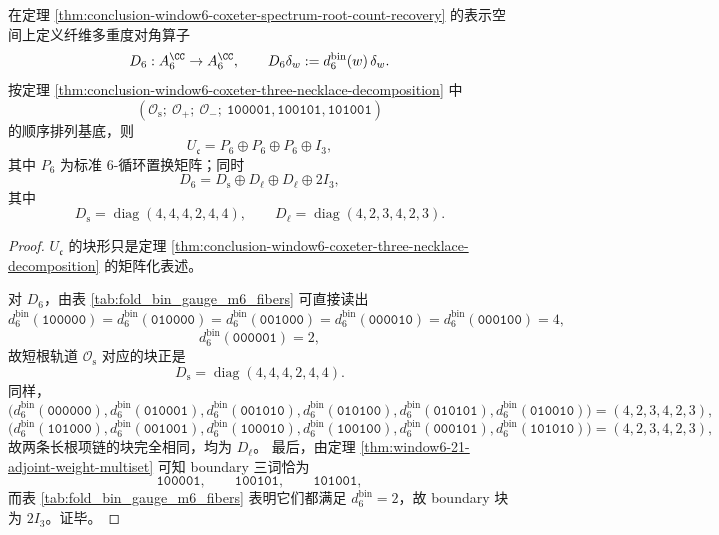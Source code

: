 \begin{theorem}\label{thm:conclusion-window6-coxeter-fold-block-normal-form}
在定理 \ref{thm:conclusion-window6-coxeter-spectrum-root-count-recovery} 的表示空间上定义纤维多重度对角算子
\[
D_6:A_6^{\CC}\to A_6^{\CC},\qquad
D_6\delta_w:=d_6^{\mathrm{bin}}(w)\,\delta_w.
\]
按定理 \ref{thm:conclusion-window6-coxeter-three-necklace-decomposition} 中
\[
(\mathcal O_{\mathrm{s}};\ \mathcal O_{+};\ \mathcal O_{-};\ \texttt{100001},\texttt{100101},\texttt{101001})
\]
的顺序排列基底，则
\[
U_{\mathfrak c}=P_6\oplus P_6\oplus P_6\oplus I_3,
\]
其中 \(P_6\) 为标准 \(6\)-循环置换矩阵；同时
\[
D_6=D_{\mathrm{s}}\oplus D_{\ell}\oplus D_{\ell}\oplus 2I_3,
\]
其中
\[
D_{\mathrm{s}}=\operatorname{diag}(4,4,4,2,4,4),\qquad
D_{\ell}=\operatorname{diag}(4,2,3,4,2,3).
\]
\end{theorem}
\begin{proof}
\(U_{\mathfrak c}\) 的块形只是定理 \ref{thm:conclusion-window6-coxeter-three-necklace-decomposition} 的矩阵化表述。

对 \(D_6\)，由表 \ref{tab:fold_bin_gauge_m6_fibers} 可直接读出
\[
d_6^{\mathrm{bin}}(\texttt{100000})=
d_6^{\mathrm{bin}}(\texttt{010000})=
d_6^{\mathrm{bin}}(\texttt{001000})=
d_6^{\mathrm{bin}}(\texttt{000010})=
d_6^{\mathrm{bin}}(\texttt{000100})=4,
\]
\[
d_6^{\mathrm{bin}}(\texttt{000001})=2,
\]
故短根轨道 \(\mathcal O_{\mathrm{s}}\) 对应的块正是
\[
D_{\mathrm{s}}=\operatorname{diag}(4,4,4,2,4,4).
\]
同样，
\[
\bigl(
d_6^{\mathrm{bin}}(\texttt{000000}),
d_6^{\mathrm{bin}}(\texttt{010001}),
d_6^{\mathrm{bin}}(\texttt{001010}),
d_6^{\mathrm{bin}}(\texttt{010100}),
d_6^{\mathrm{bin}}(\texttt{010101}),
d_6^{\mathrm{bin}}(\texttt{010010})
\bigr)
=(4,2,3,4,2,3),
\]
\[
\bigl(
d_6^{\mathrm{bin}}(\texttt{101000}),
d_6^{\mathrm{bin}}(\texttt{001001}),
d_6^{\mathrm{bin}}(\texttt{100010}),
d_6^{\mathrm{bin}}(\texttt{100100}),
d_6^{\mathrm{bin}}(\texttt{000101}),
d_6^{\mathrm{bin}}(\texttt{101010})
\bigr)
=(4,2,3,4,2,3),
\]
故两条长根项链的块完全相同，均为 \(D_{\ell}\)。
最后，由定理 \ref{thm:window6-21-adjoint-weight-multiset} 可知 boundary 三词恰为
\[
\texttt{100001},\qquad \texttt{100101},\qquad \texttt{101001},
\]
而表 \ref{tab:fold_bin_gauge_m6_fibers} 表明它们都满足 \(d_6^{\mathrm{bin}}=2\)，故 boundary 块为 \(2I_3\)。证毕。
\end{proof}


